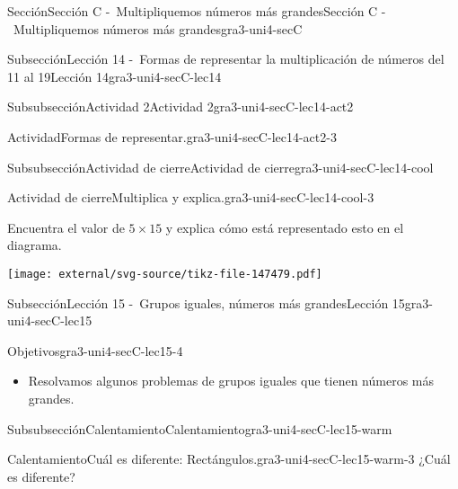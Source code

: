 \documentclass[twoside,10pt,]{article}
\begin{document}
\begin{sectionptx}{Sección}{Sección C -~Multipliquemos números más grandes}{}{Sección C -~Multipliquemos números más grandes}{}{}{gra3-uni4-secC}
\begin{subsectionptx}{Subsección}{Lección 14 -~Formas de representar la multiplicación de números del 11 al 19}{}{Lección 14}{}{}{gra3-uni4-secC-lec14}
\begin{subsubsectionptx}{Subsubsección}{Actividad 2}{}{Actividad 2}{}{}{gra3-uni4-secC-lec14-act2}
\begin{activity}{Actividad}{Formas de representar.}{gra3-uni4-secC-lec14-act2-3}
\begin{enumerate}
\end{enumerate}
\end{activity}%
\end{subsubsectionptx}
%
%
\typeout{************************************************}
\typeout{************************************************}
%
\begin{subsubsectionptx}{Subsubsección}{Actividad de cierre}{}{Actividad de cierre}{}{}{gra3-uni4-secC-lec14-cool}
\begin{project}{Actividad de cierre}{Multiplica y explica.}{gra3-uni4-secC-lec14-cool-3}%
\begin{sidebyside}{2}{0}{0}{0}%
\begin{sbspanel}{0.5}%
Encuentra el valor de \(5\times 15\) y explica cómo está representado esto en el diagrama.%
\end{sbspanel}%
\begin{sbspanel}{0.5}%
\texttt{[image: external/svg-source/tikz-file-147479.pdf]}
\end{sbspanel}%
\end{sidebyside}%
\end{project}%
\end{subsubsectionptx}
\end{subsectionptx}
%
%
\typeout{************************************************}
\typeout{************************************************}
%
\begin{subsectionptx}{Subsección}{Lección 15 -~Grupos iguales, números más grandes}{}{Lección 15}{}{}{gra3-uni4-secC-lec15}
\begin{objectives}{Objetivos}{gra3-uni4-secC-lec15-4}
%
\begin{itemize}[label=\textbullet]
\item{}Resolvamos algunos problemas de grupos iguales que tienen números más grandes.%
\end{itemize}
\end{objectives}
%
%
\typeout{************************************************}
\typeout{************************************************}
%
\begin{subsubsectionptx}{Subsubsección}{Calentamiento}{}{Calentamiento}{}{}{gra3-uni4-secC-lec15-warm}
\begin{exploration}{Calentamiento}{Cuál es diferente: Rectángulos.}{gra3-uni4-secC-lec15-warm-3}%
¿Cuál es diferente?%
\begin{sidebyside}{2}{0}{0}{0}%

\end{sidebyside}
\end{exploration}
\end{subsubsectionptx}
\end{subsectionptx}
\end{sectionptx}
\end{document}

